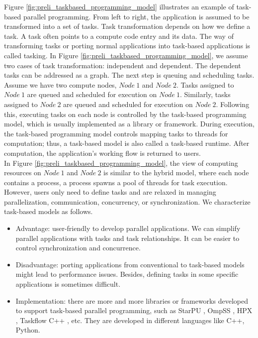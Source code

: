 Figure \ref{fig:preli_taskbased_programming_model} illustrates an example of task-based parallel programming. From left to right, the application is assumed to be transformed into a set of tasks. Task transformation depends on how we define a task. A task often points to a compute code entry and its data. The way of transforming tasks or porting normal applications into task-based applications is called tasking. In Figure \ref{fig:preli_taskbased_programming_model}, we assume two cases of task transformation: independent and dependent. The dependent tasks can be addressed as a graph. The next step is queuing and scheduling tasks. Assume we have two compute nodes, $Node\ 1$ and $Node\ 2$. Tasks assigned to $Node\ 1$ are queued and scheduled for execution on $Node\ 1$. Similarly, tasks assigned to $Node\ 2$ are queued and scheduled for execution on $Node\ 2$. Following this, executing tasks on each node is controlled by the task-based programming model, which is usually implemented as a library or framework. During execution, the task-based programming model controls mapping tasks to threads for computation; thus, a task-based model is also called a task-based runtime. After computation, the application's working flow is returned to users.\\

In Figure \ref{fig:preli_taskbased_programming_model}, the view of computing resources on $Node\ 1$ and $Node\ 2$ is similar to the hybrid model, where each node contains a process, a process spawns a pool of threads for task execution. However, users only need to define tasks and are relaxed in managing parallelization, communication, concurrency, or synchronization. We characterize task-based models as follows.
\begin{itemize}
	\item Advantage: user-friendly to develop parallel applications. We can simplify parallel applications with tasks and task relationships. It can be easier to control synchronization and concurrence.
	\item Disadvantage: porting applications from conventional to task-based models might lead to performance issues. Besides, defining tasks in some specific applications is sometimes difficult.
	\item Implementation: there are more and more libraries or frameworks developed to support task-based parallel programming, such as StarPU \cite{augonnet2011starpu}, OmpSS \cite{duran2011ompss}, HPX \cite{kaiser2014hpx}, Taskflow C++ \cite{huang2020cpp}, etc. They are developed in different languages like C++, Python.
\end{itemize}

